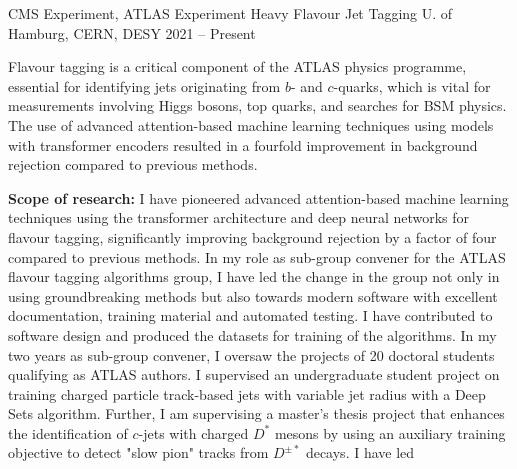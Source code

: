 



\begin{cventries}
\cventry
  {CMS Experiment, ATLAS Experiment} %
  {Heavy Flavour Jet Tagging} %
  {U. of Hamburg, CERN, DESY} %
  {2021 -- Present} %
{
  \begin{cvitems} %
    \item {Flavour tagging is a critical component of the ATLAS physics programme, essential for identifying jets originating from \(b\)- and \(c\)-quarks, which is vital for measurements involving Higgs bosons, top quarks, and searches for BSM physics. The use of advanced attention-based machine learning
    techniques using models with transformer encoders resulted in a fourfold improvement in
    background rejection compared to previous methods.}
    \item \textbf{Scope of research:} I have pioneered advanced attention-based machine learning techniques
    using the transformer architecture and deep neural networks for flavour tagging, significantly
    improving background rejection by a factor of four compared to previous methods. In my role
    as sub-group convener for the ATLAS flavour tagging algorithms group, I have led the
    change in the group not only in using groundbreaking methods but also towards modern
    software with excellent documentation, training material and automated testing. I have
    contributed to software design and produced the datasets for training of the algorithms. In my
    two years as sub-group convener, I oversaw the projects of 20 doctoral students qualifying as
    ATLAS authors. I supervised an undergraduate student project on training charged particle
    track-based jets with variable jet radius with a Deep Sets algorithm. Further, I am supervising
    a master's thesis project that enhances the identification of \(c\)-jets with charged \(D^{\ast}\) mesons by
    using an auxiliary training objective to detect "slow pion" tracks from \(D^{\pm \ast}\) decays. I have led

\end{cvitems}}
\end{cventries}
